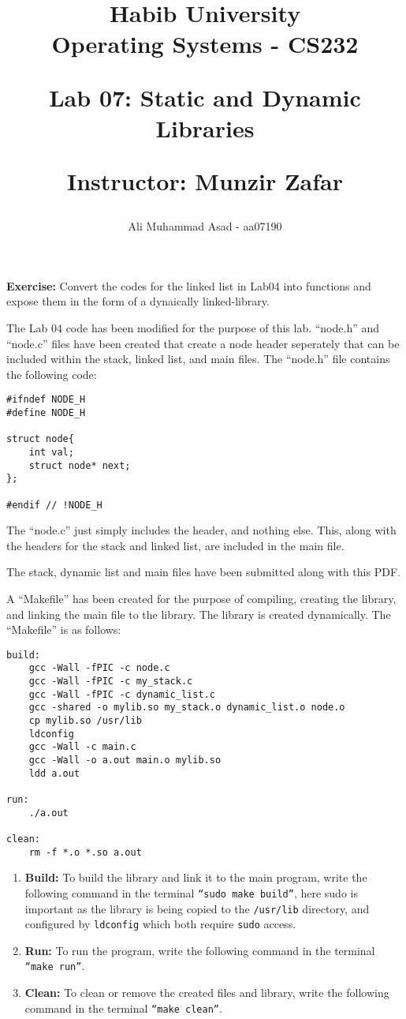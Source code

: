 \documentclass{article}
\title{{\huge \textbf{Habib University \\ Operating Systems - CS232 }}

\vspace*{5mm}
{\LARGE \textbf{Lab 07: Static and Dynamic Libraries}}

{\Large \textbf{Instructor:} Munzir Zafar}}
\author{Ali Muhammad Asad - aa07190}
\date{}
\theoremstyle{mytheoremstyle}
\theoremstyle{mytheoremstyle}
\theoremstyle{myproblemstyle}
\begin{document}
\maketitle

\noindent \textbf{Exercise:} Convert the codes for the linked list in Lab04 into functions and expose them in the form of a dynaically linked-library.

The Lab 04 code has been modified for the purpose of this lab. ``node.h'' and ``node.c'' files have been created that create a node header seperately that can be included within the stack, linked list, and main files. The ``node.h'' file contains the following code:
\begin{lstlisting}[caption={Node Header}, label={lst:node_header}]
#ifndef NODE_H
#define NODE_H

struct node{
    int val;
    struct node* next;
};

#endif // !NODE_H
\end{lstlisting} 

The ``node.c'' just simply includes the header, and nothing else. This, along with the headers for the stack and linked list, are included in the main file. 

The stack, dynamic list and main files have been submitted along with this PDF.

A ``Makefile'' has been created for the purpose of compiling, creating the library, and linking the main file to the library. The library is created dynamically. The ``Makefile'' is as follows:

\begin{lstlisting}[caption={Makefile}, label={lst:makefile}]
build:
	gcc -Wall -fPIC -c node.c
	gcc -Wall -fPIC -c my_stack.c
	gcc -Wall -fPIC -c dynamic_list.c
	gcc -shared -o mylib.so my_stack.o dynamic_list.o node.o
	cp mylib.so /usr/lib
	ldconfig
	gcc -Wall -c main.c
	gcc -Wall -o a.out main.o mylib.so
	ldd a.out

run:
	./a.out

clean:
	rm -f *.o *.so a.out
\end{lstlisting}

\begin{enumerate}
    \item \textbf{Build:} To build the library and link it to the main program, write the following command in the terminal \texttt{``sudo make build''}, here sudo is important as the library is being copied to the \texttt{/usr/lib} directory, and configured by \texttt{ldconfig} which both require \texttt{sudo} access. 
    \item \textbf{Run:} To run the program, write the following command in the terminal \texttt{``make run''}.
    \item \textbf{Clean:} To clean or remove the created files and library, write the following command in the terminal \texttt{``make clean''}.
\end{enumerate}
\end{document}
